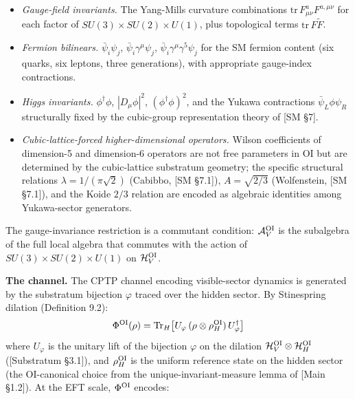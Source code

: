 \documentclass[
]{article}
\providecommand{\tightlist}{%
  \setlength{\itemsep}{0pt}\setlength{\parskip}{0pt}}
\begin{document}
\begin{itemize}
\tightlist
\item
  \emph{Gauge-field invariants.} The Yang-Mills curvature combinations
  \(\mathrm{tr}\, F_{\mu\nu}^a F^{a,\mu\nu}\) for each factor of
  \(SU(3) \times SU(2) \times U(1)\), plus topological terms
  \(\mathrm{tr}\, F \tilde F\).
\item
  \emph{Fermion bilinears.} \(\bar\psi_i \psi_j\),
  \(\bar\psi_i \gamma^\mu \psi_j\),
  \(\bar\psi_i \gamma^\mu \gamma^5 \psi_j\) for the SM fermion content
  (six quarks, six leptons, three generations), with appropriate
  gauge-index contractions.
\item
  \emph{Higgs invariants.} \(\phi^\dagger \phi\), \(|D_\mu \phi|^2\),
  \((\phi^\dagger \phi)^2\), and the Yukawa contractions
  \(\bar\psi_L \phi \psi_R\) structurally fixed by the cubic-group
  representation theory of {[}SM §7{]}.
\item
  \emph{Cubic-lattice-forced higher-dimensional operators.} Wilson
  coefficients of dimension-5 and dimension-6 operators are not free
  parameters in OI but are determined by the cubic-lattice substratum
  geometry; the specific structural relations
  \(\lambda = 1/(\pi\sqrt 2)\) (Cabibbo, {[}SM §7.1{]}),
  \(A = \sqrt{2/3}\) (Wolfenstein, {[}SM §7.1{]}), and the Koide \(2/3\)
  relation are encoded as algebraic identities among Yukawa-sector
  generators.
\end{itemize}

The gauge-invariance restriction is a commutant condition:
\(\mathcal{A}_V^{\rm OI}\) is the subalgebra of the full local algebra
that commutes with the action of \(SU(3) \times SU(2) \times U(1)\) on
\(\mathcal{H}_V^{\rm OI}\).

\textbf{The channel.} The CPTP channel encoding visible-sector dynamics
is generated by the substratum bijection \(\varphi\) traced over the
hidden sector. By Stinespring dilation (Definition 9.2):
\[\Phi^{\rm OI}(\rho) = \mathrm{Tr}_H\big[U_\varphi \, (\rho \otimes \rho_H^{\rm OI}) \, U_\varphi^\dagger\big]\]
where \(U_\varphi\) is the unitary lift of the bijection \(\varphi\) on
the dilation \(\mathcal{H}_V^{\rm OI} \otimes \mathcal{H}_H^{\rm OI}\)
({[}Substratum §3.1{]}), and \(\rho_H^{\rm OI}\) is the uniform
reference state on the hidden sector (the OI-canonical choice from the
unique-invariant-measure lemma of {[}Main §1.2{]}). At the EFT scale,
\(\Phi^{\rm OI}\) encodes:
\end{document}

